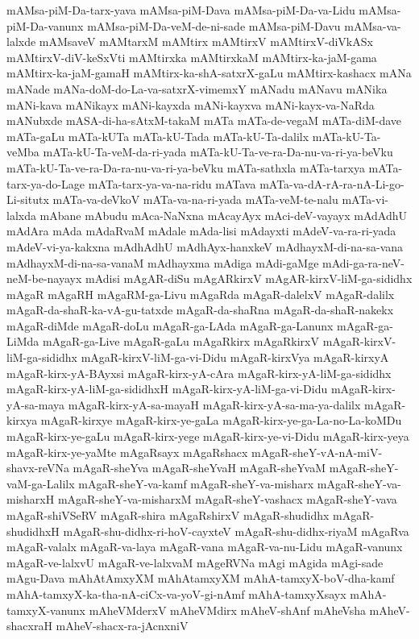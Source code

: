 {mAMsa-piM-Da-tarx-yava
mAMsa-piM-Dava
mAMsa-piM-Da-va-Lidu
mAMsa-piM-Da-vanunx
mAMsa-piM-Da-veM-de-ni-sade
mAMsa-piM-Davu
mAMsa-va-lalxde
mAMsaveV
mAMtarxM
mAMtirx
mAMtirxV
mAMtirxV-diVkASx
mAMtirxV-diV-keSxVti
mAMtirxka
mAMtirxkaM
mAMtirx-ka-jaM-gama
mAMtirx-ka-jaM-gamaH
mAMtirx-ka-shA-satxrX-gaLu
mAMtirx-kashacx
mANa
mANade
mANa-doM-do-La-va-satxrX-vimemxY
mANadu
mANavu
mANika
mANi-kava
mANikayx
mANi-kayxda
mANi-kayxva
mANi-kayx-va-NaRda
mANubxde
mASA-di-ha-sAtxM-takaM
mATa
mATa-de-vegaM
mATa-diM-dave
mATa-gaLu
mATa-kUTa
mATa-kU-Tada
mATa-kU-Ta-dalilx
mATa-kU-Ta-veMba
mATa-kU-Ta-veM-da-ri-yada
mATa-kU-Ta-ve-ra-Da-nu-va-ri-ya-beVku
mATa-kU-Ta-ve-ra-Da-ra-nu-va-ri-ya-beVku
mATa-sathxla
mATa-tarxya
mATa-tarx-ya-do-Lage
mATa-tarx-ya-va-na-ridu
mATava
mATa-va-dA-rA-ra-nA-Li-go-Li-situtx
mATa-va-deVkoV
mATa-va-na-ri-yada
mATa-veM-te-nalu
mATa-vi-lalxda
mAbane
mAbudu
mAca-NaNxna
mAcayAyx
mAci-deV-vayayx
mAdAdhU
mAdAra
mAda
mAdaRvaM
mAdale
mAda-lisi
mAdayxti
mAdeV-va-ra-ri-yada
mAdeV-vi-ya-kakxna
mAdhAdhU
mAdhAyx-hanxkeV
mAdhayxM-di-na-sa-vana
mAdhayxM-di-na-sa-vanaM
mAdhayxma
mAdiga
mAdi-gaMge
mAdi-ga-ra-neV-neM-be-nayayx
mAdisi
mAgAR-diSu
mAgARkirxV
mAgAR-kirxV-liM-ga-sididhx
mAgaR
mAgaRH
mAgaRM-ga-Livu
mAgaRda
mAgaR-dalelxV
mAgaR-dalilx
mAgaR-da-shaR-ka-vA-gu-tatxde
mAgaR-da-shaRna
mAgaR-da-shaR-nakekx
mAgaR-diMde
mAgaR-doLu
mAgaR-ga-LAda
mAgaR-ga-Lanunx
mAgaR-ga-LiMda
mAgaR-ga-Live
mAgaR-gaLu
mAgaRkirx
mAgaRkirxV
mAgaR-kirxV-liM-ga-sididhx
mAgaR-kirxV-liM-ga-vi-Didu
mAgaR-kirxVya
mAgaR-kirxyA
mAgaR-kirx-yA-BAyxsi
mAgaR-kirx-yA-cAra
mAgaR-kirx-yA-liM-ga-sididhx
mAgaR-kirx-yA-liM-ga-sididhxH
mAgaR-kirx-yA-liM-ga-vi-Didu
mAgaR-kirx-yA-sa-maya
mAgaR-kirx-yA-sa-mayaH
mAgaR-kirx-yA-sa-ma-ya-dalilx
mAgaR-kirxya
mAgaR-kirxye
mAgaR-kirx-ye-gaLa
mAgaR-kirx-ye-ga-La-no-La-koMDu
mAgaR-kirx-ye-gaLu
mAgaR-kirx-yege
mAgaR-kirx-ye-vi-Didu
mAgaR-kirx-yeya
mAgaR-kirx-ye-yaMte
mAgaRsayx
mAgaRshacx
mAgaR-sheY-vA-nA-miV-shavx-reVNa
mAgaR-sheYva
mAgaR-sheYvaH
mAgaR-sheYvaM
mAgaR-sheY-vaM-ga-Lalilx
mAgaR-sheY-va-kamf
mAgaR-sheY-va-misharx
mAgaR-sheY-va-misharxH
mAgaR-sheY-va-misharxM
mAgaR-sheY-vashacx
mAgaR-sheY-vava
mAgaR-shiVSeRV
mAgaR-shira
mAgaRshirxV
mAgaR-shudidhx
mAgaR-shudidhxH
mAgaR-shu-didhx-ri-hoV-cayxteV
mAgaR-shu-didhx-riyaM
mAgaRva
mAgaR-valalx
mAgaR-va-laya
mAgaR-vana
mAgaR-va-nu-Lidu
mAgaR-vanunx
mAgaR-ve-lalxvU
mAgaR-ve-lalxvaM
mAgeRVNa
mAgi
mAgida
mAgi-sade
mAgu-Dava
mAhAtAmxyXM
mAhAtamxyXM
mAhA-tamxyX-boV-dha-kamf
mAhA-tamxyX-ka-tha-nA-ciCx-va-yoV-gi-nAmf
mAhA-tamxyXsayx
mAhA-tamxyX-vanunx
mAheVMderxV
mAheVMdirx
mAheV-shAnf
mAheVsha
mAheV-shacxraH
mAheV-shacx-ra-jAcnxniV
}
